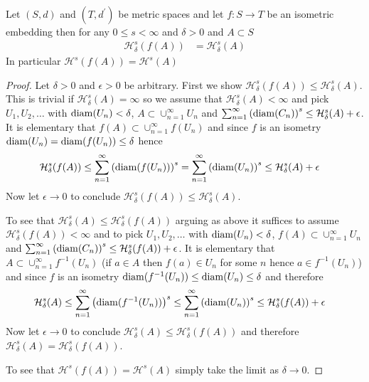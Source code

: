 \begin{prop}\label{HausdorffMeasureUnderIsometry}Let $(S,d)$ and $(T,d^\prime)$ be metric spaces and let $f : S \to T$ be an isometric embedding then for any $0 \leq s < \infty$ and $\delta>0$ and $A \subset S$
\begin{align*}
\mathcal{H}_\delta^s(f(A)) &= \mathcal{H}_\delta^s(A)
\end{align*}
In particular $\mathcal{H}^s(f(A)) = \mathcal{H}^s(A)$
\end{prop}
\begin{proof}
Let $\delta>0$ and $\epsilon>0$ be arbitrary.  First we show $\mathcal{H}^s_\delta (f(A)) \leq \mathcal{H}^s_\delta(A)$.  This is trivial if $\mathcal{H}^s_\delta(A) =\infty$ so we assume that $\mathcal{H}^s_\delta(A) <\infty$ and pick $U_1, U_2, \dotsc$ with $\operatorname*{diam}(U_n) < \delta$, $A \subset \cup_{n=1}^\infty U_n$ and $\sum_{n=1}^\infty \left( \operatorname*{diam}(C_n) \right)^s \leq \mathcal{H}^s_\delta(A)+\epsilon$.  It is elementary that $f(A) \subset \cup_{n=1}^\infty f(U_n)$ and since $f$ is an isometry $\operatorname*{diam}(U_n) = \operatorname*{diam}(f(U_n)) \leq \delta$ hence
\begin{align*}
\mathcal{H}^s_\delta (f(A)) &\leq \sum_{n=1}^\infty \left( \operatorname*{diam}(f(U_n)) \right)^s = \sum_{n=1}^\infty \left( \operatorname*{diam}(U_n) \right)^s \leq \mathcal{H}^s_\delta(A)+\epsilon
\end{align*}
Now let $\epsilon \to 0$ to conclude $\mathcal{H}^s_\delta (f(A)) \leq \mathcal{H}^s_\delta(A)$.

To see that $\mathcal{H}^s_\delta(A) \leq \mathcal{H}^s_\delta (f(A))$ arguing as above it suffices to assume $\mathcal{H}^s_\delta (f(A)) < \infty$ and to pick $U_1, U_2, \dotsc$ with $\operatorname*{diam}(U_n) < \delta$, $f(A) \subset \cup_{n=1}^\infty U_n$ and $\sum_{n=1}^\infty \left( \operatorname*{diam}(C_n) \right)^s \leq \mathcal{H}^s_\delta(f(A))+\epsilon$.  It is elementary that $A \subset \cup_{n=1}^\infty f^{-1}(U_n)$ (if $a \in A$ then $f(a) \in U_n$ for some $n$ hence $a \in f^{-1}(U_n)$)
and since $f$ is an isometry $\operatorname*{diam}(f^{-1}(U_n)) \leq \operatorname*{diam}(U_n) \leq \delta$ and therefore
\begin{align*}
\mathcal{H}^s_\delta (A) &\leq \sum_{n=1}^\infty \left( \operatorname*{diam}(f^{-1}(U_n)) \right)^s \leq \sum_{n=1}^\infty \left( \operatorname*{diam}(U_n) \right)^s \leq \mathcal{H}^s_\delta(f(A))+\epsilon
\end{align*}
Now let $\epsilon \to 0$ to conclude $\mathcal{H}^s_\delta (A) \leq \mathcal{H}^s_\delta(f(A))$ and therefore $\mathcal{H}^s_\delta (A) = \mathcal{H}^s_\delta(f(A))$.
 
To see that $\mathcal{H}^s(f(A)) = \mathcal{H}^s(A)$ simply take the limit as $\delta \to 0$.
\end{proof}

